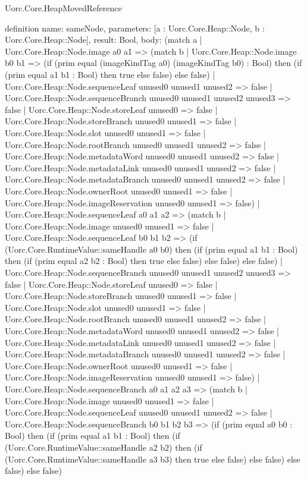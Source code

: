 \begin{lexlean}{Uorc.Core.HeapMovedReference}
\begin{semanticmodule}
definition{
  name: sameNode,
  parameters: [a : Uorc.Core.Heap::Node, b : Uorc.Core.Heap::Node],
  result: Bool,
  body: (match a
    | Uorc.Core.Heap::Node.image a0 a1 => (match b
      | Uorc.Core.Heap::Node.image b0 b1 => (if (prim equal (imageKindTag a0) (imageKindTag b0) : Bool) then (if (prim equal a1 b1 : Bool) then true else false) else false)
      | Uorc.Core.Heap::Node.sequenceLeaf unused0 unused1 unused2 => false
      | Uorc.Core.Heap::Node.sequenceBranch unused0 unused1 unused2 unused3 => false
      | Uorc.Core.Heap::Node.storeLeaf unused0 => false
      | Uorc.Core.Heap::Node.storeBranch unused0 unused1 => false
      | Uorc.Core.Heap::Node.slot unused0 unused1 => false
      | Uorc.Core.Heap::Node.rootBranch unused0 unused1 unused2 => false
      | Uorc.Core.Heap::Node.metadataWord unused0 unused1 unused2 => false
      | Uorc.Core.Heap::Node.metadataLink unused0 unused1 unused2 => false
      | Uorc.Core.Heap::Node.metadataBranch unused0 unused1 unused2 => false
      | Uorc.Core.Heap::Node.ownerRoot unused0 unused1 => false
      | Uorc.Core.Heap::Node.imageReservation unused0 unused1 => false)
    | Uorc.Core.Heap::Node.sequenceLeaf a0 a1 a2 => (match b
      | Uorc.Core.Heap::Node.image unused0 unused1 => false
      | Uorc.Core.Heap::Node.sequenceLeaf b0 b1 b2 => (if (Uorc.Core.RuntimeValue::sameHandle a0 b0) then (if (prim equal a1 b1 : Bool) then (if (prim equal a2 b2 : Bool) then true else false) else false) else false)
      | Uorc.Core.Heap::Node.sequenceBranch unused0 unused1 unused2 unused3 => false
      | Uorc.Core.Heap::Node.storeLeaf unused0 => false
      | Uorc.Core.Heap::Node.storeBranch unused0 unused1 => false
      | Uorc.Core.Heap::Node.slot unused0 unused1 => false
      | Uorc.Core.Heap::Node.rootBranch unused0 unused1 unused2 => false
      | Uorc.Core.Heap::Node.metadataWord unused0 unused1 unused2 => false
      | Uorc.Core.Heap::Node.metadataLink unused0 unused1 unused2 => false
      | Uorc.Core.Heap::Node.metadataBranch unused0 unused1 unused2 => false
      | Uorc.Core.Heap::Node.ownerRoot unused0 unused1 => false
      | Uorc.Core.Heap::Node.imageReservation unused0 unused1 => false)
    | Uorc.Core.Heap::Node.sequenceBranch a0 a1 a2 a3 => (match b
      | Uorc.Core.Heap::Node.image unused0 unused1 => false
      | Uorc.Core.Heap::Node.sequenceLeaf unused0 unused1 unused2 => false
      | Uorc.Core.Heap::Node.sequenceBranch b0 b1 b2 b3 => (if (prim equal a0 b0 : Bool) then (if (prim equal a1 b1 : Bool) then (if (Uorc.Core.RuntimeValue::sameHandle a2 b2) then (if (Uorc.Core.RuntimeValue::sameHandle a3 b3) then true else false) else false) else false) else false)
}
\end{semanticmodule}
\end{lexlean}
